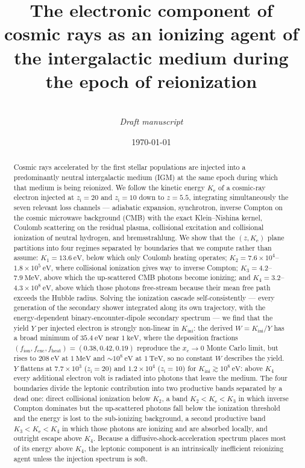 \documentclass[twocolumn]{article}
\title{\bf The electronic component of cosmic rays as an ionizing agent
of the intergalactic medium during the epoch of reionization}
\author{%
  \\[2pt]
  \small \textit{Draft manuscript}
}
\date{\today}
\newcommand{\Ke}{K_{\mathrm{e}}}
\newcommand{\Kini}{K_{\mathrm{ini}}}
\newcommand{\zi}{z_{\mathrm{i}}}
\begin{document}
\maketitle

\begin{abstract}
\noindent
Cosmic rays accelerated by the first stellar populations are injected into a
predominantly neutral intergalactic medium (IGM) at the same epoch during which
that medium is being reionized. We follow the kinetic energy $\Ke$ of a
cosmic-ray electron injected at $\zi = 20$ and $\zi = 10$ down to $z = 5.5$,
integrating simultaneously the seven relevant loss channels --- adiabatic
expansion, synchrotron, inverse Compton on the cosmic microwave background
(CMB) with the exact Klein--Nishina kernel, Coulomb scattering on the residual
plasma, collisional excitation and collisional ionization of neutral hydrogen,
and bremsstrahlung. We show that the $(z,\Ke)$ plane partitions into four
regimes separated by boundaries that we compute rather than assume:
$K_1 = 13.6\ \mathrm{eV}$, below which only Coulomb heating operates;
$K_2 = 7.6\times10^{4}$--$1.8\times10^{5}\ \mathrm{eV}$, where collisional
ionization gives way to inverse Compton; $K_3 = 4.2$--$7.9\ \mathrm{MeV}$,
above which the up-scattered CMB photons become ionizing; and
$K_4 = 3.2$--$4.3\times10^{8}\ \mathrm{eV}$, above which those photons
free-stream because their mean free path exceeds the Hubble radius. Solving the ionization
cascade self-consistently --- every generation of the secondary shower
integrated along its own trajectory, with the energy-dependent
binary-encounter-dipole secondary spectrum --- we find that the yield $Y$ per
injected electron is strongly non-linear in $\Kini$: the derived
$W = \Kini/Y$ has a broad minimum of $35.4\ \mathrm{eV}$ near
$1\ \mathrm{keV}$, where the deposition fractions
$(f_{\mathrm{ion}}, f_{\mathrm{exc}}, f_{\mathrm{heat}}) = (0.38, 0.42, 0.19)$
reproduce the $x_e\rightarrow0$ Monte Carlo limit, but rises to
$208\ \mathrm{eV}$ at $1\ \mathrm{MeV}$ and $\sim\!10^{8}\ \mathrm{eV}$ at
$1\ \mathrm{TeV}$, so no constant $W$ describes the yield. $Y$ flattens at
$7.7\times10^{3}$ ($\zi=20$) and $1.2\times10^{4}$ ($\zi=10$)
for $\Kini \gtrsim 10^{8}\ \mathrm{eV}$: above $K_4$ every additional electron
volt is radiated into photons that leave the medium. The four boundaries divide
the leptonic contribution into two productive bands separated by a dead one:
direct collisional ionization below $K_2$, a band $K_2 < \Ke < K_3$ in which
inverse Compton dominates but the up-scattered photons fall below the
ionization threshold and the energy is lost to the sub-ionizing background, a
second productive band $K_3 < \Ke < K_4$ in which those photons are ionizing
and are absorbed locally, and outright escape above $K_4$. Because a
diffusive-shock-acceleration spectrum places most of its energy above $K_4$,
the leptonic component is an intrinsically inefficient reionizing agent unless
the injection spectrum is soft.
\end{abstract}
\end{document}
